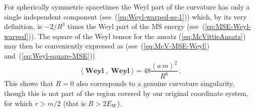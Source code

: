 \documentclass
[rmp,aps,twocolumn,showpacs,preprintnumbers,amsmath,amssymb]{revtex4}
\theoremstyle{plain}
\theoremstyle{definition}
\theoremstyle{remark}
\newcommand{\sss}{\scriptscriptstyle}
\newcommand{\ind}[1]{{\sss \text{#1}}}        %
\newcommand{\br}[1]{\mathbf{#1}}              %
\newcommand{\sprod}[2]{\langle#1,#2\rangle}   %
\DeclareMathOperator{\Weyl}{\br{Weyl}}        %
\begin{document}
For spherically symmetric spacetimes the Weyl part of the curvature has 
only a single independent component (see~(\ref{eq:Weyl-warped-ss-1})) 
which, by its very definition, is $-2/R^3$ times the Weyl part of the 
MS energy (see~(\ref{eq:MSE-Weyl-warped})). The square of the Weyl tensor 
for the ansatz (\ref{eq:McVittieAnsatz}) may then be conveniently expressed 
as (see~(\ref{eq:McV-MSE-Weyl}) and~(\ref{eq:Weyl-square-MSE})) 
%
\begin{equation}\label{eq:Weyl-norm-McV}
  \sprod{\Weyl}{\Weyl} = 48\frac{(a\,m)^2}{R^6} \,.
\end{equation}
%
This shows that $R=0$ also corresponds to a genuine curvature singularity, 
though this is not part of the region covered by our original coordinate 
system, for which $r>m/2$ (that is $R>2E_\ind{W}$). 
\end{document}
